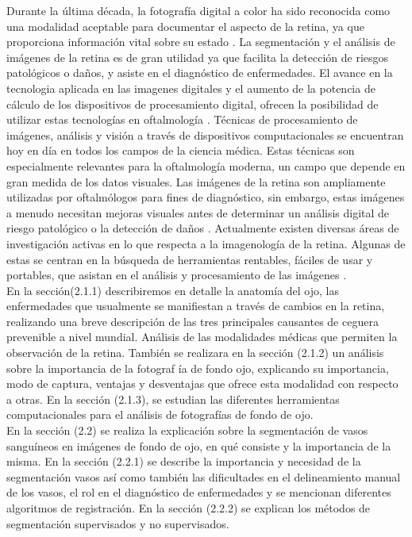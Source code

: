 Durante la \'ultima d\'ecada, la fotograf\'ia digital a color ha sido reconocida como una modalidad aceptable para documentar el aspecto de la retina, ya que proporciona informaci\'on vital sobre su estado \cite{patton2006retinal} \cite{cummings2002organisation} \cite{fransen2002clinical} \cite{hansen2004screening} \cite{klein2004comparability}.  La segmentaci\'on y el an\'alisis de im\'agenes de la retina es de gran utilidad ya que facilita la detecci\'on de riesgos patol\'ogicos o da\~nos, y asiste en el diagn\'ostico de enfermedades. 
El avance en la tecnologia aplicada en las imagenes digitales y  el aumento de la potencia de c\'alculo de los dispositivos de procesamiento digital, ofrecen la posibilidad de utilizar estas tecnolog\'ias en oftalmolog\'ia \cite{van2003grading}. 
T\'ecnicas de procesamiento de imágenes, análisis y visión a trav\'es de dispositivos computacionales se encuentran hoy en d\'ia en todos los campos de la ciencia m\'edica. Estas técnicas son especialmente relevantes para la oftalmología moderna, un campo que depende en gran medida de los datos visuales. Las im\'agenes de la retina son ampliamente utilizadas por oftalm\'ologos para fines de diagn\'ostico, sin embargo, estas im\'agenes a menudo necesitan mejoras visuales antes de determinar un an\'alisis digital de riesgo patol\'ogico o la detecci\'on de da\~nos  \cite{marrugo2011retinal}.
Actualmente existen diversas \'areas de investigación activas en lo que respecta a la imagenología de la retina. Algunas de estas se centran en la b\'usqueda de herramientas rentables, f\'aciles de usar y portables, que asistan en el an\'alisis y procesamiento de las im\'agenes \cite{abramoff2010retinal}.\\ 


En la secci\'on(2.1.1) describiremos en detalle la anatom\'ia del ojo, las enfermedades que usualmente se manifiestan a trav\'es de cambios en la retina, realizando una breve descripci\'on de las tres principales causantes de ceguera prevenible a nivel mundial. An\'alisis de las modalidades m\'edicas que permiten la observaci\'on de la retina. Tambi\'en se realizara en la secci\'on (2.1.2) un an\'alisis sobre la importancia de la fotograf \'ia de fondo ojo, explicando su importancia, modo de captura, ventajas y desventajas que ofrece esta modalidad con respecto a otras. En la secci\'on (2.1.3), se estudian las diferentes herramientas computacionales para el an\'alisis de fotograf\'ias de fondo de ojo.\\

En la secci\'on (2.2) se realiza la explicaci\'on sobre la segmentaci\'on de vasos sangu\'ineos en im\'agenes de fondo de ojo, en qu\'e consiste y la importancia de la misma.
En la secci\'on (2.2.1) se describe la importancia y necesidad de la segmentaci\'on vasos  as\'i como tambi\'en las dificultades en el delineamiento manual de los vasos, el rol en el diagn\'ostico de enfermedades y se mencionan diferentes algoritmos de registraci\'on.
En la secci\'on (2.2.2) se explican los m\'etodos de segmentaci\'on supervisados y no supervisados.

